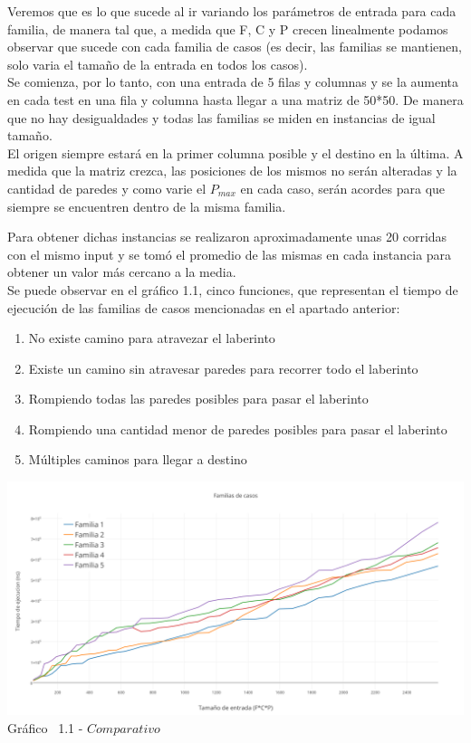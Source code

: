 \indent Veremos que es lo que sucede al ir variando los parámetros de entrada para cada familia, de manera tal que, a medida que F, C y P crecen linealmente podamos observar que sucede con cada familia de casos (es decir, las familias se mantienen, solo varia el tamaño de la entrada en todos los casos).\\
Se comienza, por lo tanto, con una entrada de 5 filas y columnas y se la aumenta en cada test en una fila y columna hasta llegar a una matriz de 50*50. De manera que no hay desigualdades y todas las familias se miden en instancias de igual tamaño.\\
El origen siempre estará en la primer columna posible y el destino en la última. A medida que la matriz crezca, las posiciones de los mismos no serán alteradas y la cantidad de paredes y como varie el $P_{max}$ en cada caso, serán acordes para que siempre se encuentren dentro de la misma familia.

Para obtener dichas instancias se realizaron aproximadamente unas 20 corridas con el mismo input y se tom\'o el promedio de las mismas en cada instancia para obtener un valor m\'as cercano a la media.\\ 



Se puede observar en el  gráfico 1.1, cinco funciones, que representan el tiempo de ejecuci\'on de las familias de casos mencionadas en el apartado anterior:\\

\begin{enumerate}
\item No existe camino para atravezar el laberinto
\item Existe un camino sin atravesar paredes para recorrer todo el laberinto
\item Rompiendo todas las paredes posibles para pasar el laberinto
\item Rompiendo una cantidad menor de paredes posibles para pasar el laberinto
\item Múltiples caminos para llegar a destino
\end{enumerate}

\vspace*{0.3cm} \vspace*{0.3cm}
  \begin{center}
 \includegraphics[scale=0.5]{./EJ1/comparativo.png}
 {Gr\'afico \ 1.1 - $Comparativo$}
  \end{center}
  \vspace*{0.3cm}
  
